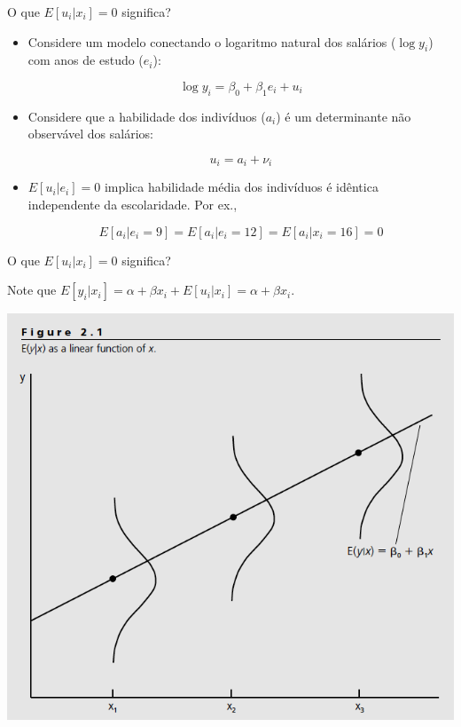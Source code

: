 \documentclass[10pt,slides,xcolor=pdftex,dvipsnames,table]{beamer}
\begin{document}

\begin{frame}{O que $E[u_i |x_i ] = 0$ significa?}

\begin{itemize}\itemsep1.2em
	
	\item Considere um modelo conectando o logaritmo natural dos salários ($\log y_i$) com anos de estudo ($e_i$):
	
	$$ \log y_i = \beta_0 + \beta_1 e_i + u_i$$ 
	
	\item Considere que a habilidade dos indivíduos ($a_i$) é um determinante não observável dos salários:
	
	$$ u_i = a_i + \nu_i $$
	
	\item $E[u_i |e_i ] = 0$ implica habilidade média dos indivíduos é idêntica independente da escolaridade. Por ex.,
	
	$$E[a_i | e_i = 9 ] = E[a_i | e_i = 12 ] = E[a_i | x_i = 16 ] = 0$$
        
\end{itemize}

\end{frame}


\begin{frame}{O que $E[u_i |x_i ] = 0$ significa?}

\begin{block}{}
Note que $ E[y_i|x_i] = \alpha + \beta x_i + E[u_i|x_i] = \alpha + \beta x_i $.
\end{block}
       
\begin{center} 
\includegraphics[scale=0.3]{fig1}
\end{center}

\end{frame}
\end{document}
